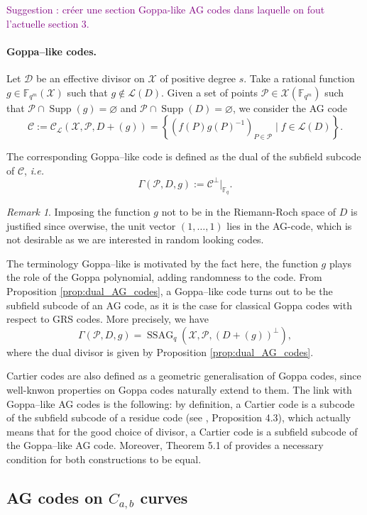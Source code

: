 \documentclass[a4paper]{article}
\theoremstyle{definition}
\theoremstyle{remark}
\newtheorem{remark}{Remark}
\newcommand{\calP}{\mathcal{P}}
\newcommand{\calL}{\mathcal{L}}
\newcommand{\calC}{\mathcal{C}}
\newcommand{\calD}{\mathcal{D}}
\newcommand{\calX}{\mathcal{X}}
\newcommand{\fqm}{\mathbb{F}_{q^m}}
\newcommand{\fq}{\mathbb{F}_{q}}
\newcommand{\set}[1]{\left\{#1\right\}}
\newcommand{\Supp}{\operatorname{Supp}}
\newcommand{\ssag}[1]{\operatorname{SSAG}_{q}\left(#1\right)}
\newcommand\jade[1]{\textcolor{purple}{#1}}
\begin{document}
\jade{Suggestion : créer une section Goppa-like AG codes dans laquelle on fout l'actuelle section 3.}
\paragraph{Goppa--like codes.} Let $\calD$ be an effective divisor on $\calX$ of positive degree $s$. Take a rational function $g \in \fqm(\calX)$ such that $g \notin \calL(D)$. Given a set of points $\calP \in \calX(\fqm)$ such that $\calP \cap \Supp(g) = \varnothing$ and $\calP \cap \Supp(D) = \varnothing$, we consider the AG code
\[\calC := \calC_{\calL}(\calX,\calP,D+(g))=\set{\left(f(P)g(P)^{-1}\right)_{P \in \calP} \mid f \in \calL(D)}.\]

The corresponding Goppa--like code is defined as the dual of the subfield subcode of $\calC$, \emph{i.e.}
$$ \Gamma(\calP,D,g) := \calC^{\perp}|_{\fq}.$$

\begin{remark} \label{rq:g_notin_L(D)}
Imposing the function $g$ not to be in the Riemann-Roch space of $D$ is justified since overwise, the unit vector $(1,\dots,1)$ lies in the AG-code, which is not desirable as we are interested in random looking codes. 
\end{remark}


The terminology Goppa--like is motivated by the fact here, the function $g$ plays the role of the Goppa polynomial, adding randomness to the code. From Proposition \ref{prop:dual_AG_codes}, a Goppa--like code turns out to be the subfield subcode of an AG code, as it is the case for classical Goppa codes with respect to GRS codes. More precisely, we have 
$$ \Gamma(\calP,D,g) = \ssag{\calX,\calP,(D+(g))^{\perp}},$$
where the dual divisor is given by Proposition \ref{prop:dual_AG_codes}. 

Cartier codes \cite{Cou14} are also defined as a geometric generalisation of Goppa codes, since well-knwon properties on Goppa codes naturally extend to them.
The link with Goppa--like AG codes is the following: by definition, a Cartier code is a subcode of the subfield subcode of a residue code (see \cite{Cou14}, Proposition 4.3), which actually means that for the good choice of divisor, a Cartier code is a subfield subcode of the Goppa--like AG code. Moreover, Theorem 5.1 of \cite{Cou14} provides a necessary condition for both constructions to be equal.






\subsection{AG codes on $C_{a,b}$ curves} \label{section:C_a,b_codes}
\end{document}
